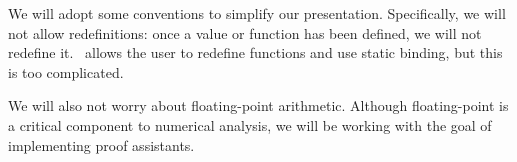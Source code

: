 \begin{node}[Conventions]\label{sml-0001}%
We will adopt some conventions to simplify our
presentation. Specifically, we will not allow redefinitions: once a
value or function has been defined, we will not redefine
it. \SML\ allows the user to redefine functions and use static binding,
but this is too complicated.

We will also not worry about floating-point arithmetic. Although
floating-point is a critical component to numerical analysis, we will be
working with the goal of implementing proof assistants.
\end{node}
